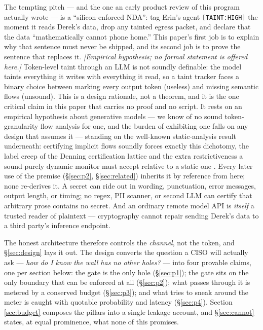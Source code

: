 \documentclass[11pt,a4paper]{article}
\begin{document}
The tempting pitch --- and the one an early product review of this program actually wrote --- is a ``silicon-enforced NDA'': tag
Erin's agent \texttt{[TAINT:HIGH]} the moment it reads Derek's data, drop any tainted egress packet, and declare that the data
``mathematically cannot phone home.'' This paper's first job is to explain why that sentence must never be shipped, and its second
job is to prove the sentence that replaces it. \emph{[Empirical hypothesis; no formal statement is offered here.]} Token-level
taint through an LLM is not soundly definable: the model taints everything it writes with everything it read, so a taint tracker
faces a binary choice between marking every output token (useless) and missing semantic flows (unsound). This is a design
rationale, not a theorem, and it is the one critical claim in this paper that carries no proof and no script. It rests on an
empirical hypothesis about generative models --- we know of no sound token-granularity flow analysis for one, and the burden of
exhibiting one falls on any design that assumes it --- standing on the well-known static-analysis result underneath: certifying
implicit flows soundly forces exactly this dichotomy, the label creep of the Denning certification lattice \cite{denning77} and
the extra restrictiveness a sound purely dynamic monitor must accept relative to a static one \cite{rs10}. Every later use of the
premise (\S\ref{sec:p2}, \S\ref{sec:related}) inherits it by reference from here; none re-derives it. A secret can ride out in
wording, punctuation, error messages, output length, or
timing; no regex, PII scanner, or second LLM can certify that arbitrary prose contains no secret. And an ordinary remote model API
is \emph{itself} a trusted reader of plaintext --- cryptography cannot repair sending Derek's data to a third party's inference
endpoint.

The honest architecture therefore controls the \emph{channel}, not the token, and \S\ref{sec:design} lays it out. The design
converts the question a CISO will actually ask --- \emph{how do I know the wall has no other holes?} --- into four provable
claims, one per section below: the gate is the only hole (\S\ref{sec:p1}); the gate sits on the only boundary that can be enforced
at all (\S\ref{sec:p2}); what passes through it is metered by a conserved budget (\S\ref{sec:p3}); and what tries to sneak around
the meter is caught with quotable probability and latency (\S\ref{sec:p4}). Section \ref{sec:budget} composes the pillars into a
single leakage account, and \S\ref{sec:cannot} states, at equal prominence, what none of this promises.
\end{document}

